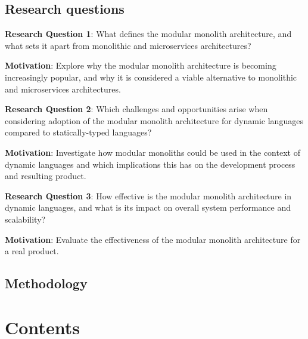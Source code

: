 \documentclass[12pt]{article}
\begin{document}
	\clearpage

	\subsection*{Research questions}\label{subsec:research-questions}

	\textbf{Research Question 1}: What defines the modular monolith architecture, and what sets it apart from monolithic and microservices architectures?

	\textbf{Motivation}: Explore why the modular monolith architecture is becoming increasingly popular, and why it is considered a viable alternative to monolithic and microservices architectures.

	\textbf{Research Question 2}: Which challenges and opportunities arise when considering adoption of the modular monolith architecture for dynamic languages compared to statically-typed languages?

	\textbf{Motivation}: Investigate how modular monoliths could be used in the context of dynamic languages and which implications this has on the development process and resulting product.

	\textbf{Research Question 3}: How effective is the modular monolith architecture in dynamic languages, and what is its impact on overall system performance and scalability?

	\textbf{Motivation}: Evaluate the effectiveness of the modular monolith architecture for a real product.

	\clearpage

	\subsection*{Methodology}\label{subsec:methodology}

	\clearpage

	\section*{Contents}\label{sec:contents}
\end{document}
